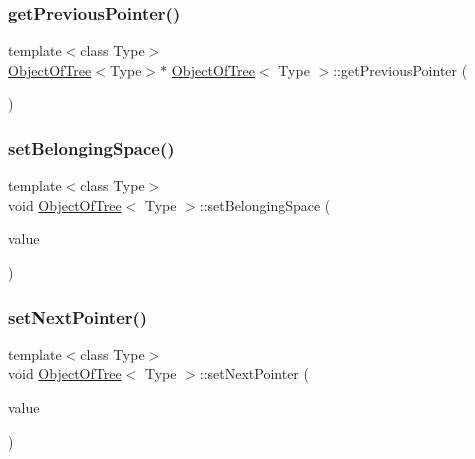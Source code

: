 \mbox{\label{class_object_of_tree_a02b74f20b90ec53dbae2d18648a9d5d1}} 
\subsubsection{\texorpdfstring{get\+Previous\+Pointer()}{getPreviousPointer()}}
{\footnotesize\ttfamily template$<$class Type$>$ \\
\mbox{\hyperlink{class_object_of_tree}{Object\+Of\+Tree}}$<$Type$>$$\ast$ \mbox{\hyperlink{class_object_of_tree}{Object\+Of\+Tree}}$<$ Type $>$\+::get\+Previous\+Pointer (\begin{DoxyParamCaption}{ }\end{DoxyParamCaption})\hspace{0.3cm}{\ttfamily [inline]}}

\mbox{\label{class_object_of_tree_a21dc9105d1a5a0d045dc43894bba3c1c}} 
\subsubsection{\texorpdfstring{set\+Belonging\+Space()}{setBelongingSpace()}}
{\footnotesize\ttfamily template$<$class Type$>$ \\
void \mbox{\hyperlink{class_object_of_tree}{Object\+Of\+Tree}}$<$ Type $>$\+::set\+Belonging\+Space (\begin{DoxyParamCaption}\item[{\mbox{\hyperlink{class_space_of_tree}{Space\+Of\+Tree}}$<$ Type $>$ $\ast$}]{value }\end{DoxyParamCaption})\hspace{0.3cm}{\ttfamily [inline]}}

\mbox{\label{class_object_of_tree_a44fb225ed189197bcdfe23dcd2a7fe28}} 
\subsubsection{\texorpdfstring{set\+Next\+Pointer()}{setNextPointer()}}
{\footnotesize\ttfamily template$<$class Type$>$ \\
void \mbox{\hyperlink{class_object_of_tree}{Object\+Of\+Tree}}$<$ Type $>$\+::set\+Next\+Pointer (\begin{DoxyParamCaption}\item[{\mbox{\hyperlink{class_object_of_tree}{Object\+Of\+Tree}}$<$ Type $>$ $\ast$}]{value }\end{DoxyParamCaption})\hspace{0.3cm}{\ttfamily [inline]}}

